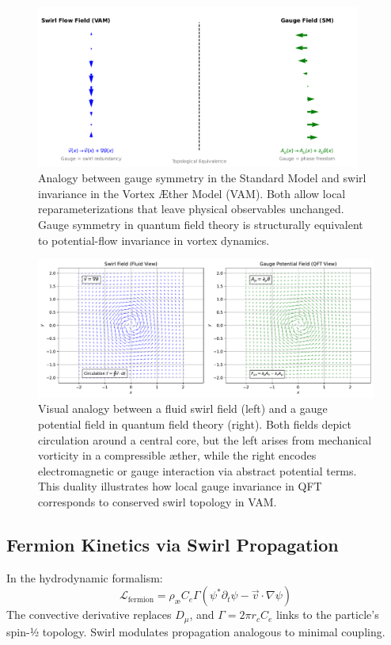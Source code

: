 \begin{figure}[H]
    \centering
    \includegraphics[width=0.95\textwidth]{gauge_swirl_equivalence}
    \caption{Analogy between gauge symmetry in the Standard Model and swirl invariance in the Vortex Æther Model (VAM). Both allow local reparameterizations that leave physical observables unchanged. Gauge symmetry in quantum field theory is structurally equivalent to potential-flow invariance in vortex dynamics.}
    \label{fig:gauge_swirl_equivalence}
\end{figure}

\begin{figure}[H]
    \centering
    \includegraphics[width=0.9\linewidth]{SwirlVSGauge}
    \caption{
        Visual analogy between a fluid swirl field (left) and a gauge potential field in quantum field theory (right).
        Both fields depict circulation around a central core, but the left arises from mechanical vorticity in a compressible æther,
        while the right encodes electromagnetic or gauge interaction via abstract potential terms.
        This duality illustrates how local gauge invariance in QFT corresponds to conserved swirl topology in VAM.
    }
    \label{fig:swirl_gauge_analogy}
\end{figure}

\subsection{Fermion Kinetics via Swirl Propagation}
In the hydrodynamic formalism:
\begin{equation}
    \mathcal{L}_{\text{fermion}} = \rho_\text{\ae} C_e \Gamma \left( \psi^* \partial_t \psi - \vec{v} \cdot \nabla \psi \right)
\end{equation}
The convective derivative replaces $D_\mu$, and $\Gamma = 2\pi r_c C_e$ links to the particle’s spin-½ topology. Swirl modulates propagation analogous to minimal coupling.

